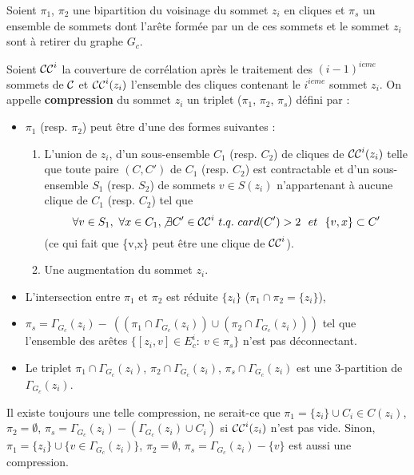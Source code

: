 Soient $\pi_1$, $\pi_2$ une bipartition du voisinage du sommet $z_i$  en cliques  et 
$\pi_s$ un ensemble  de sommets dont l'ar\^ete form\'ee par un de ces sommets et le sommet $z_i$ sont  \`a retirer du graphe $G_c$.  
\begin{definition}
Soient 
${\cal CC}^{i}$ la couverture de corr\'elation apr\`es le traitement des $(i-1)^{ieme}$ sommets de ${\cal C}$ et
${\cal CC}^{i}(z_i)$ l'ensemble des cliques contenant le $i^{ieme}$ sommet $z_i$.
\newline
On appelle {\bf compression} du sommet $z_i$ un triplet ($\pi_1$, $\pi_2$, $\pi_s$) d\'efini par : 
\begin{itemize}
	\item $\pi_1$ (resp. $\pi_2$) peut \^etre d'une des formes suivantes :
	\begin{enumerate}
		\item L'union de $z_i$, d'un sous-ensemble $C_1$ (resp. $C_2$) de cliques de ${\cal CC}^{i}(z_i)$ telle que toute paire $(C,C')$ de $C_1$ (resp. $C_2$) est contractable et d'un sous-ensemble $S_1$ (resp. $S_2$) de sommets $v \in S(z_i)$ n'appartenant \`a aucune clique de $C_1$ (resp. $C_2$) tel que
		$$ \forall v \in S_1,~\forall x \in C_1, \not\exists C' \in {\cal CC}^{i}~t.q.~card(C')>2~~et~~\{v,x\} \subset C'$$
		(ce qui fait que \{v,x\} peut \^etre une clique de ${\cal CC}^{i}$).
		\item Une augmentation du sommet $z_i$.
	\end{enumerate}
	\item L'intersection entre $\pi_1$ et $\pi_2$ est r\'eduite $\{z_i\}$ ($\pi_1 \cap \pi_2 = \{z_i\}$),
	\item $\pi_s=\Gamma_{G_c}(z_i)-~((\pi_1 \cap \Gamma_{G_c}(z_i) ) \cup(\pi_2 \cap \Gamma_{G_c}(z_i) ))$ tel que l'ensemble des ar\^etes  $\{[z_i,v]\in E_{c}^{i}:~v\in \pi_s\}$ n'est pas d\'econnectant.
	\item Le triplet $\pi_{1} \cap \Gamma_{G_c}(z_i)$, $\pi_{2} \cap \Gamma_{G_c}(z_i)$, $\pi_{s} \cap \Gamma_{G_c}(z_i)$  est une 3-partition de $\Gamma_{G_c}(z_i)$.
\end{itemize}
\end{definition}
Il existe toujours une telle compression, ne serait-ce que 
$\pi_1 = \{z_i\} \cup C_i \in C(z_i)$, 
$\pi_2 =  \emptyset$,
$\pi_s = \Gamma_{G_c}(z_i) -(\Gamma_{G_c}(z_i) \cup C_i) $  si ${\cal CC}^{i}(z_i)$ n'est pas vide.
Sinon, 
$\pi_1 = \{z_i\} \cup \{ v \in \Gamma_{G_c}(z_i)  \} $, 
$\pi_2 =  \emptyset$,
$\pi_s = \Gamma_{G_c}(z_i) - \{v\} $
est aussi une compression.

